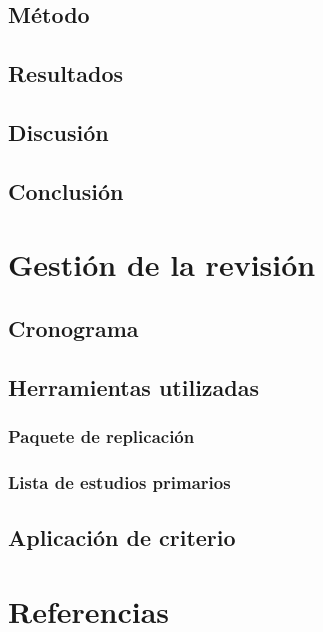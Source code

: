 \documentclass{article}
\begin{document}
\subsection{Método}
\subsection{Resultados}
\subsection{Discusión}
\subsection{Conclusión}
\section{Gestión de la revisión}
\subsection{Cronograma}
\subsection{Herramientas utilizadas}
\subsubsection{Paquete de replicación}
\subsubsection{Lista de estudios primarios}
\subsection{Aplicación de criterio}
\section{Referencias}
\end{document}
